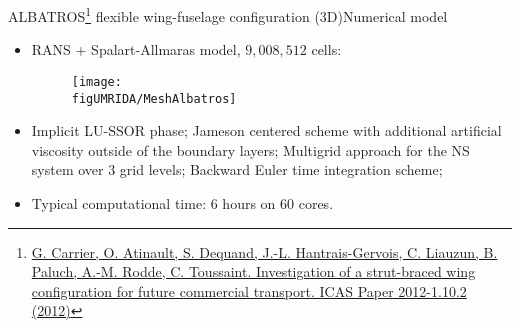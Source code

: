 \documentclass[10pt]{beamer}
\begin{document}
\begin{frame}{ALBATROS\footnote{\href{http://www.icas.org/ICAS_ARCHIVE/ICAS2012/PAPERS/597.PDF}{\scriptsize{G. Carrier, O. Atinault, S. Dequand, J.-L. Hantrais-Gervois, C. Liauzun, B. Paluch, A.-M. Rodde, C. Toussaint. Investigation of a strut-braced wing configuration for future commercial transport. ICAS Paper 2012-1.10.2 (2012)}}}
 flexible wing-fuselage configuration (3D)}{Numerical model}

\footnotesize{
\begin{itemize}
\item RANS + Spalart-Allmaras model, $9,008,512$ cells:
\begin{figure}
\centering\texttt{[image: \\figUMRIDA/MeshAlbatros]}
\end{figure}
\item Implicit LU-SSOR phase; Jameson centered scheme with additional artificial viscosity outside of the boundary layers; Multigrid approach for the NS system over $3$ grid levels; Backward Euler time integration scheme;
\item Typical computational time: 6 hours on 60 cores.
\end{itemize}
}
\end{frame}
\end{document}
